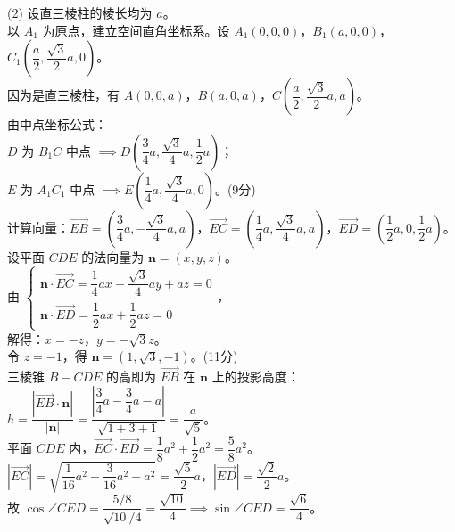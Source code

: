 {  (2) 设直三棱柱的棱长均为 \(a\)。\\
  以 \(A_1\) 为原点，建立空间直角坐标系。设 \(A_1(0,0,0)\)，\(B_1(a,0,0)\)，\\
  \(C_1\left(\dfrac{a}{2}, \dfrac{\sqrt{3}}{2}a, 0\right)\)。\\
  因为是直三棱柱，有 \(A(0,0,a)\)，\(B(a,0,a)\)，\(C\left(\dfrac{a}{2}, \dfrac{\sqrt{3}}{2}a, a\right)\)。\\
  由中点坐标公式：\\
  \(D\) 为 \(B_1C\) 中点 \(\implies D\left(\dfrac{3}{4}a, \dfrac{\sqrt{3}}{4}a, \dfrac{1}{2}a\right)\)；\\
  \(E\) 为 \(A_1C_1\) 中点 \(\implies E\left(\dfrac{1}{4}a, \dfrac{\sqrt{3}}{4}a, 0\right)\)。\hfill (9分)\\
  计算向量：\(\overrightarrow{EB} = \left(\dfrac{3}{4}a, -\dfrac{\sqrt{3}}{4}a, a\right)\)，\(\overrightarrow{EC} = \left(\dfrac{1}{4}a, \dfrac{\sqrt{3}}{4}a, a\right)\)，\(\overrightarrow{ED} = \left(\dfrac{1}{2}a, 0, \dfrac{1}{2}a\right)\)。\\
  设平面 \(CDE\) 的法向量为 \(\boldsymbol{n} = (x,y,z)\)。\\
  由 \(\begin{cases} \boldsymbol{n}\cdot\overrightarrow{EC} = \dfrac{1}{4}ax + \dfrac{\sqrt{3}}{4}ay + az = 0 \\ \boldsymbol{n}\cdot\overrightarrow{ED} = \dfrac{1}{2}ax + \dfrac{1}{2}az = 0 \end{cases}\)，\\
  解得：\(x = -z\)，\(y = -\sqrt{3}z\)。\\
  令 \(z = -1\)，得 \(\boldsymbol{n} = (1, \sqrt{3}, -1)\)。\hfill (11分)\\
  三棱锥 \(B-CDE\) 的高即为 \(\overrightarrow{EB}\) 在 \(\boldsymbol{n}\) 上的投影高度：\\
  \(h = \dfrac{|\overrightarrow{EB}\cdot\boldsymbol{n}|}{|\boldsymbol{n}|} = \dfrac{\left|\dfrac{3}{4}a - \dfrac{3}{4}a - a\right|}{\sqrt{1+3+1}} = \dfrac{a}{\sqrt{5}}\)。\\
  平面 \(CDE\) 内，\(\overrightarrow{EC}\cdot\overrightarrow{ED} = \dfrac{1}{8}a^2 + \dfrac{1}{2}a^2 = \dfrac{5}{8}a^2\)。\\
  \(| \overrightarrow{EC} | = \sqrt{\dfrac{1}{16}a^2 + \dfrac{3}{16}a^2 + a^2} = \dfrac{\sqrt{5}}{2}a\)，\(|\overrightarrow{ED}| = \dfrac{\sqrt{2}}{2}a\)。\\
  故 \(\cos\angle CED = \dfrac{5/8}{\sqrt{10}/4} = \dfrac{\sqrt{10}}{4} \implies \sin\angle CED = \dfrac{\sqrt{6}}{4}\)。\\
}
